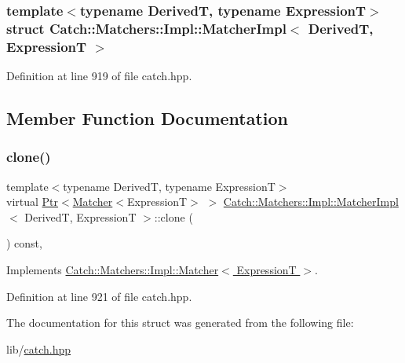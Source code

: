 \subsubsection*{template$<$typename DerivedT, typename ExpressionT$>$\newline
struct Catch\+::\+Matchers\+::\+Impl\+::\+Matcher\+Impl$<$ Derived\+T, Expression\+T $>$}



Definition at line 919 of file catch.\+hpp.



\subsection{Member Function Documentation}
\hypertarget{struct_catch_1_1_matchers_1_1_impl_1_1_matcher_impl_af7cf4b7b730145d4455dc356490e6b77}{}\label{struct_catch_1_1_matchers_1_1_impl_1_1_matcher_impl_af7cf4b7b730145d4455dc356490e6b77} 
\subsubsection{\texorpdfstring{clone()}{clone()}}
{\footnotesize\ttfamily template$<$typename DerivedT, typename ExpressionT$>$ \\
virtual \hyperlink{class_catch_1_1_ptr}{Ptr}$<$\hyperlink{struct_catch_1_1_matchers_1_1_impl_1_1_matcher}{Matcher}$<$ExpressionT$>$ $>$ \hyperlink{struct_catch_1_1_matchers_1_1_impl_1_1_matcher_impl}{Catch\+::\+Matchers\+::\+Impl\+::\+Matcher\+Impl}$<$ DerivedT, ExpressionT $>$\+::clone (\begin{DoxyParamCaption}{ }\end{DoxyParamCaption}) const\hspace{0.3cm}{\ttfamily [inline]}, {\ttfamily [virtual]}}



Implements \hyperlink{struct_catch_1_1_matchers_1_1_impl_1_1_matcher_a9d31e5018fea24efa08c3cbf5aa4475d}{Catch\+::\+Matchers\+::\+Impl\+::\+Matcher$<$ Expression\+T $>$}.



Definition at line 921 of file catch.\+hpp.



The documentation for this struct was generated from the following file\+:\begin{DoxyCompactItemize}
\item 
lib/\hyperlink{catch_8hpp}{catch.\+hpp}\end{DoxyCompactItemize}
